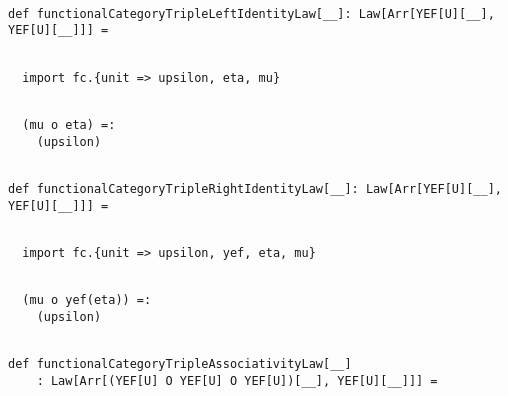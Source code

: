 \documentclass[11pt]{article}
\begin{document}
\begin{mdframed}[backgroundcolor=lightgray!20] 
\begin{lstlisting}

def functionalCategoryTripleLeftIdentityLaw[__]: Law[Arr[YEF[U][__], YEF[U][__]]] =
\end{lstlisting}
\end{mdframed}
\vspace{6pt}
\begin{mdframed}[backgroundcolor=lightgray!20] 
\begin{lstlisting}

  import fc.{unit => upsilon, eta, mu}
\end{lstlisting}
\end{mdframed}
\vspace{6pt}
\begin{mdframed}[backgroundcolor=lightgray!20] 
\begin{lstlisting}

  (mu o eta) =:
    (upsilon)
\end{lstlisting}
\end{mdframed}
\vspace{6pt}
\begin{mdframed}[backgroundcolor=lightgray!20] 
\begin{lstlisting}

def functionalCategoryTripleRightIdentityLaw[__]: Law[Arr[YEF[U][__], YEF[U][__]]] =
\end{lstlisting}
\end{mdframed}
\vspace{6pt}
\begin{mdframed}[backgroundcolor=lightgray!20] 
\begin{lstlisting}

  import fc.{unit => upsilon, yef, eta, mu}
\end{lstlisting}
\end{mdframed}
\vspace{6pt}
\begin{mdframed}[backgroundcolor=lightgray!20] 
\begin{lstlisting}

  (mu o yef(eta)) =:
    (upsilon)
\end{lstlisting}
\end{mdframed}
\vspace{6pt}
\begin{mdframed}[backgroundcolor=lightgray!20] 
\begin{lstlisting}

def functionalCategoryTripleAssociativityLaw[__]
    : Law[Arr[(YEF[U] O YEF[U] O YEF[U])[__], YEF[U][__]]] =
\end{lstlisting}
\end{mdframed}
\end{document}
